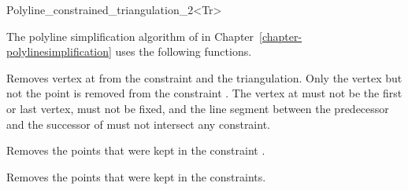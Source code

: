 \begin{ccRefClass}{Polyline_constrained_triangulation_2<Tr>}



The polyline simplification algorithm of in Chapter~\ref{chapter-polylinesimplification}
uses the following functions.

{Removes vertex at  from the constraint and the triangulation.
Only the vertex but not the point is removed from the constraint .
\ccPrecond The vertex at  must not be the first or last vertex, must not be fixed, and the line segment between the predecessor  and 
the successor  of  must not intersect any constraint.} 

{Removes the points that were kept in the constraint .}

{Removes the points that were kept in the constraints.}

\ccSeeAlso
{} \\
 \\
 \\
 \\

\end{ccRefClass}

